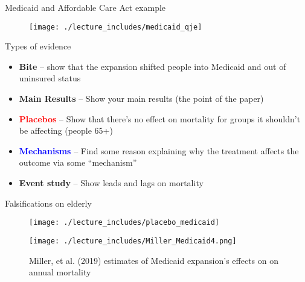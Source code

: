 \documentclass{beamer}
\begin{document}
\begin{frame}{Medicaid and Affordable Care Act example}

\begin{figure}
\texttt{[image: ./lecture\_includes/medicaid\_qje]}
\end{figure}

\end{frame}
\begin{frame}{Types of evidence}

\begin{itemize}
\item \textbf{Bite} -- show that the expansion shifted people into Medicaid and out of uninsured status
\item \textbf{Main Results} -- Show your main results (the point of the paper)
\item \textcolor{red}{\textbf{Placebos}} -- Show that there's no effect on mortality for groups it shouldn't be affecting (people 65+)
\item \textcolor{blue}{\textbf{Mechanisms}} -- Find some reason explaining why the treatment affects the outcome via some ``mechanism''
\item \textbf{Event study} -- Show leads and lags on mortality
\end{itemize}

\end{frame}






\begin{frame}{Falsifications on elderly}

	\begin{figure}
\texttt{[image: ./lecture\_includes/placebo\_medicaid]}
	\end{figure}

\end{frame}



\begin{frame}[plain]

	\begin{figure}
	\texttt{[image: ./lecture\_includes/Miller\_Medicaid4.png]}
	\caption{Miller, et al. (2019) estimates of Medicaid expansion's effects on on annual mortality}
	\end{figure}

\end{frame}
\end{document}
